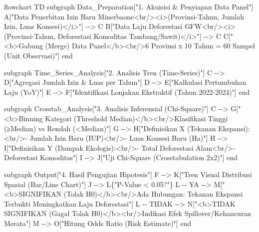 \documentclass[
]{article}
\newenvironment{Shaded}{}{}
\newcommand{\NormalTok}[1]{#1}
\begin{document}
\begin{Shaded}
\begin{Highlighting}[]
\NormalTok{flowchart TD}
\NormalTok{    subgraph Data\_Preparation["1. Akuisisi \& Penyiapan Data Panel"]}
\NormalTok{        A["Data Penerbitan Izin Baru Minerbaone\textless{}br/\textgreater{}\textless{}i\textgreater{}(Provinsi{-}Tahun, Jumlah Izin, Luas Konsesi)\textless{}/i\textgreater{}"] {-}{-}\textgreater{} C}
\NormalTok{        B["Data Laju Deforestasi GFW\textless{}br/\textgreater{}\textless{}i\textgreater{}(Provinsi{-}Tahun, Deforestasi Komoditas Tambang/Sawit)\textless{}/i\textgreater{}"] {-}{-}\textgreater{} C}
\NormalTok{        C["\textless{}b\textgreater{}Gabung (Merge) Data Panel\textless{}/b\textgreater{}\textless{}br/\textgreater{}6 Provinsi x 10 Tahun = 60 Sampel (Unit Observasi)"]}
\NormalTok{    end}

\NormalTok{    subgraph Time\_Series\_Analysis["2. Analisis Tren (Time{-}Series)"]}
\NormalTok{        C {-}{-}\textgreater{} D["Agregasi Jumlah Izin \& Luas per Tahun"]}
\NormalTok{        D {-}{-}\textgreater{} E["Kalkulasi Pertumbuhan Laju (YoY)"]}
\NormalTok{        E {-}{-}\textgreater{} F["Identifikasi Lonjakan Ekstraktif (Tahun 2022{-}2024)"]}
\NormalTok{    end}

\NormalTok{    subgraph Crosstab\_Analysis["3. Analisis Inferensial (Chi{-}Square)"]}
\NormalTok{        C {-}{-}\textgreater{} G["\textless{}b\textgreater{}Binning Kategori (Threshold Median)\textless{}/b\textgreater{}\textless{}br/\textgreater{}Klasifikasi Tinggi (≥Median) vs Rendah (\textless{}Median)"]}
\NormalTok{        G {-}{-}\textgreater{} H["Definisikan X (Tekanan Ekspansi):\textless{}br/\textgreater{}{-} Jumlah Izin Baru (IUP)\textless{}br/\textgreater{}{-} Luas Konsesi Baru (Ha)"]}
\NormalTok{        H {-}{-}\textgreater{} I["Definisikan Y (Dampak Ekologis):\textless{}br/\textgreater{}{-} Total Deforestasi Alam\textless{}br/\textgreater{}{-} Deforestasi Komoditas"]}
\NormalTok{        I {-}{-}\textgreater{} J["Uji Chi{-}Square (Crosstabulation 2x2)"]}
\NormalTok{    end}

\NormalTok{    subgraph Output["4. Hasil Pengujian Hipotesis"]}
\NormalTok{        F {-}{-}\textgreater{} K["Tren Visual Distribusi Spasial (Bar/Line Chart)"]}
\NormalTok{        J {-}{-}\textgreater{} L\{"P{-}Value \textless{} 0.05?"\}}
\NormalTok{        L {-}{-} YA {-}{-}\textgreater{} M["\textless{}b\textgreater{}SIGNIFIKAN (Tolak H0)\textless{}/b\textgreater{}\textless{}br/\textgreater{}Ada Hubungan: Tekanan Ekspansi Terbukti Meningkatkan Laju Deforestasi"]}
\NormalTok{        L {-}{-} TIDAK {-}{-}\textgreater{} N["\textless{}b\textgreater{}TIDAK SIGNIFIKAN (Gagal Tolak H0)\textless{}/b\textgreater{}\textless{}br/\textgreater{}Indikasi Efek Spillover/Kehancuran Merata"]}
\NormalTok{        M {-}{-}\textgreater{} O["Hitung Odds Ratio (Risk Estimate)"]}
\NormalTok{    end}
\end{Highlighting}
\end{Shaded}
\end{document}
